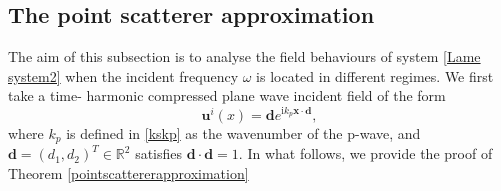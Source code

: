 \documentclass[10pt,reqno,oneside]{amsart}%
\theoremstyle{definition}
\theoremstyle{remark}
\numberwithin{equation}{section}
\numberwithin{equation}{section}
\begin{document}
\subsection{The point scatterer approximation}%
The aim of this subsection is to analyse the field behaviours of system \eqref{Lame system2} when the incident frequency $\omega$ is located in different regimes. We first take a time- harmonic compressed plane wave incident field of the form
\begin{equation}\label{ui}
	\mathbf{u}^{i}(x)=\mathbf{d}e^{\mathrm{i}k_p\boldsymbol{x}\cdot\mathbf{d}},
\end{equation}
where $k_p$ is defined in \eqref{kskp} as the wavenumber of the p-wave, and $\mathbf{d}=(d_1,d_2)^{T}\in\mathbb{R}^{2}$ satisfies $\mathbf{d}\cdot\mathbf{d}=1$. In what follows, we provide the proof of Theorem \ref{pointscattererapproximation}
\end{document}
